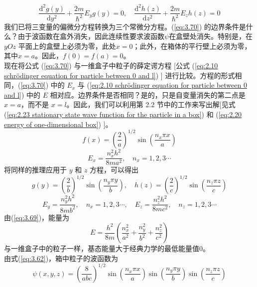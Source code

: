 	\begin{equation}
		\frac{\mathrm{d}^2g\left(y\right)}{\mathrm{d}y^2}+\frac{2m}{\hbar^2}E_yg\left(y\right) = 0, \quad \frac{\mathrm{d}^2h\left(z\right)}{\mathrm{d}z^2}+\frac{2m}{\hbar^2}E_zh\left(z\right) = 0
		\label{eq:3.71}
	\end{equation}
	我们已将三变量的偏微分方程转换为三个常微分方程。(\ref{eq:3.70}) 的边界条件是什么？由于波函数在盒外消失，因此连续性要求波函数$\psi$在盒壁处消失。特别是，在 $yOz$ 平面上的盒壁上必须为零，此处$x=0$；此外，在箱体的平行壁上必须为零，其中$x=a$。因此，$f\left(0\right) = f\left(a\right) = 0$。\\
	\indent 现在将公式 (\ref{eq:3.70}) 与一维盒子中粒子的薛定谔方程 [公式 (\ref{eq:2.10 schrödinger equation for particle between 0 and l}) ] 进行比较。方程的形式相同，(\ref{eq:3.70}) 中的 $E_x$ 与 (\ref{eq:2.10 schrödinger equation for particle between 0 and l}) 中的 $E$ 相对应。边界条件是否相同？是的，只是自变量消失的第二点是 $x=a$，而不是 $x=l$。因此，我们可以利用第 2.2 节中的工作来写出解[见式 (\ref{eq:2.23 stationary state wave function for the particle in a box}) 和 (\ref{eq:2.20 energy of one-dimensional box}) ]。
	\begin{equation*}
		f\left(x\right) = \left(\frac{2}{a}\right)^{1/2}\sin\left(\frac{n_x\pi x}{a}\right)
	\end{equation*}
	\begin{equation*}
		E_x = \frac{n_x^2h^2}{8ma^2}, \quad n_x = 1,2,3\cdots
	\end{equation*}
	将同样的推理应用于 $y$ 和 $z$ 方程，可以得出
	\begin{equation*}
		g\left(y\right) = \left(\frac{2}{b}\right)^{1/2}\sin\left(\frac{n_y\pi y}{b}\right), \quad h\left(z\right) = \left(\frac{2}{c}\right)^{1/2}\sin\left(\frac{n_z\pi z}{c}\right)
	\end{equation*}
	\begin{equation*}
		E_y = \frac{n_y^2h^2}{8mb^2}, \quad n_x = 1,2,3\cdots, \quad E_z = \frac{n_z^2h^2}{8mc^2}, \quad n_z = 1,2,3\cdots
	\end{equation*}
	\indent 由(\ref{eq:3.69})，能量为
	\begin{equation}
		E = \frac{h^2}{8m}\left(\frac{n_x^2}{a^2}+\frac{n_y^2}{b^2}+\frac{n_z^2}{c^2}\right)
		\label{eq:3.72}
	\end{equation}
	与一维盒子中的粒子一样，基态能量大于经典力学的最低能量值0。\\
	\indent 由式(\ref{eq:3.62})，箱中粒子的波函数为
	\begin{equation}
		\psi\left(x,y,z\right) = \left(\frac{8}{abc}\right)^{1/2}\sin\left(\frac{n_x\pi x}{a}\right)\sin\left(\frac{n_y\pi y}{b}\right)\sin\left(\frac{n_z\pi z}{c}\right)
		\label{eq:3.73}
	\end{equation}
